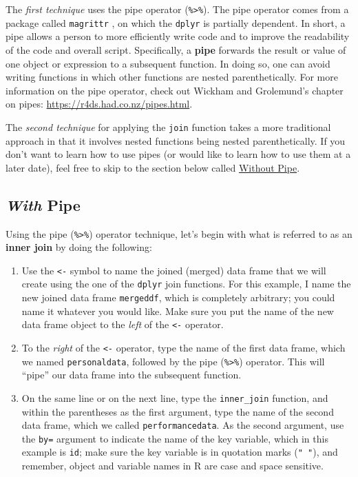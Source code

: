 \documentclass[]{book}
\providecommand{\tightlist}{%
  \setlength{\itemsep}{0pt}\setlength{\parskip}{0pt}}
\begin{document}
The \emph{first technique} uses the pipe operator
(\texttt{\%\textgreater{}\%}). The pipe operator comes from a package
called \texttt{magrittr} \citep{R-magrittr}, on which the \texttt{dplyr}
is partially dependent. In short, a pipe allows a person to more
efficiently write code and to improve the readability of the code and
overall script. Specifically, a \textbf{pipe} forwards the result or
value of one object or expression to a subsequent function. In doing so,
one can avoid writing functions in which other functions are nested
parenthetically. For more information on the pipe operator, check out
Wickham and Grolemund's \citeyearpar{wickham2017} chapter on pipes:
\url{https://r4ds.had.co.nz/pipes.html}.

The \emph{second technique} for applying the \texttt{join} function
takes a more traditional approach in that it involves nested functions
being nested parenthetically. If you don't want to learn how to use
pipes (or would like to learn how to use them at a later date), feel
free to skip to the section below called
\protect\hyperlink{opt2_join_withoutpipe}{Without Pipe}.

\hypertarget{opt2_join_withpipe}{\subsection{\texorpdfstring{\emph{With}
Pipe}{With Pipe}}\label{opt2_join_withpipe}}

Using the pipe (\texttt{\%\textgreater{}\%}) operator technique, let's
begin with what is referred to as an \textbf{inner join} by doing the
following:

\begin{enumerate}
\def\labelenumi{\arabic{enumi}.}
\tightlist
\item
  Use the \texttt{\textless{}-} symbol to name the joined (merged) data
  frame that we will create using the one of the \texttt{dplyr} join
  functions. For this example, I name the new joined data frame
  \texttt{mergeddf}, which is completely arbitrary; you could name it
  whatever you would like. Make sure you put the name of the new data
  frame object to the \emph{left} of the \texttt{\textless{}-} operator.
\item
  To the \emph{right} of the \texttt{\textless{}-} operator, type the
  name of the first data frame, which we named \texttt{personaldata},
  followed by the pipe (\texttt{\%\textgreater{}\%}) operator. This will
  ``pipe'' our data frame into the subsequent function.
\item
  On the same line or on the next line, type the \texttt{inner\_join}
  function, and within the parentheses as the first argument, type the
  name of the second data frame, which we called
  \texttt{performancedata}. As the second argument, use the \texttt{by=}
  argument to indicate the name of the key variable, which in this
  example is \texttt{id}; make sure the key variable is in quotation
  marks (\texttt{"\ "}), and remember, object and variable names in R
  are case and space sensitive.
\end{enumerate}
\end{document}
